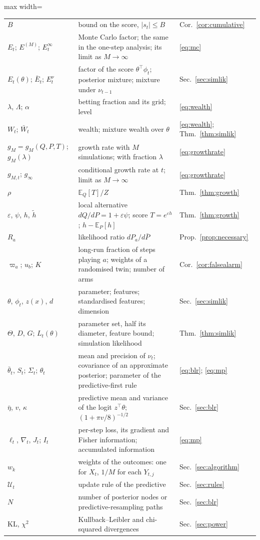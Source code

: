 \documentclass[11pt]{article}
\newcommand{\E}{\mathbb{E}}
\newcommand{\KL}{\mathrm{KL}}
\theoremstyle{remark}
\begin{document}
\begin{table}[h]
\begin{adjustbox}{max width=\textwidth}
\begin{tabular}{lll}
$B$ & bound on the score, $|s_t| \le B$ & Cor.~\ref{cor:cumulative} \\
$E_t$; $E^{(M)}$; $E_t^\infty$ & Monte Carlo factor; the same in the one-step analysis; its limit as $M \to \infty$ & \eqref{eq:mc} \\
$E_t(\theta)$; $\bar E_t$; $E_t^{\nu}$ & factor of the score $\theta^\top\phi_t$; posterior mixture; mixture under $\nu_{t-1}$ & Sec.~\ref{sec:simlik} \\
$\lambda$, $\Lambda$; $\alpha$ & betting fraction and its grid; level & \eqref{eq:wealth} \\
$W_t$; $\bar W_t$ & wealth; mixture wealth over $\theta$ & \eqref{eq:wealth}; Thm.~\ref{thm:simlik} \\
\midrule
$g_M = g_M(Q, P, T)$; $g_M(\lambda)$ & growth rate with $M$ simulations; with fraction $\lambda$ & \eqref{eq:growthrate} \\
$g_{M,t}$; $g_\infty$ & conditional growth rate at $t$; limit as $M \to \infty$ & \eqref{eq:growthrate} \\
$\rho$ & $\E_Q[T]/Z$ & Thm.~\ref{thm:growth} \\
$\varepsilon$, $\psi$, $h$, $\tilde h$ & local alternative $dQ/dP = 1 + \varepsilon\psi$; score $T = e^{\varepsilon h}$; $h - \E_P[h]$ & Thm.~\ref{thm:growth} \\
$R_a$ & likelihood ratio $dP_a/d\bar P$ & Prop.~\ref{prop:necessary} \\
$\varpi_a$; $u_b$; $K$ & long-run fraction of steps playing $a$; weights of a randomised twin; number of arms & Cor.~\ref{cor:falsealarm} \\
\midrule
$\theta$, $\phi_t$, $z(x)$, $d$ & parameter; features; standardised features; dimension & Sec.~\ref{sec:simlik} \\
$\Theta$, $D$, $G$; $L_t(\theta)$ & parameter set, half its diameter, feature bound; simulation likelihood & Thm.~\ref{thm:simlik} \\
$\bar\theta_t$, $S_t$; $\Sigma_t$; $\theta_t$ & mean and precision of $\nu_t$; covariance of an approximate posterior; parameter of the predictive-first rule & \eqref{eq:blr}; \eqref{eq:mp} \\
$\bar\eta$, $v$, $\kappa$ & predictive mean and variance of the logit $z^\top\theta$; $(1 + \pi v/8)^{-1/2}$ & Sec.~\ref{sec:blr} \\
$\ell_t$, $\nabla_t$, $J_t$; $I_t$ & per-step loss, its gradient and Fisher information; accumulated information & \eqref{eq:mp} \\
$w_k$ & weights of the outcomes: one for $X_t$, $1/M$ for each $Y_{t,j}$ & Sec.~\ref{sec:algorithm} \\
$\mathcal U_t$ & update rule of the predictive & Sec.~\ref{sec:rules} \\
$N$ & number of posterior nodes or predictive-resampling paths & Sec.~\ref{sec:blr} \\
\midrule
$\KL$, $\chi^2$ & Kullback--Leibler and chi-squared divergences & Sec.~\ref{sec:power} \\
\bottomrule
\end{tabular}
\end{adjustbox}
\end{table}
\end{document}
